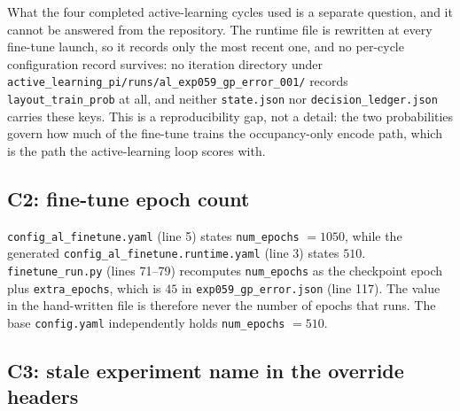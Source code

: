What the four completed active-learning cycles used is a separate question, and it cannot
be answered from the repository. The runtime file is rewritten at every fine-tune launch,
so it records only the most recent one, and no per-cycle configuration record survives: no
iteration directory under
\texttt{active\_learning\_pi/runs/al\_exp059\_gp\_error\_001/} records
\texttt{layout\_train\_prob} at all, and neither \texttt{state.json} nor
\texttt{decision\_ledger.json} carries these keys. This is a reproducibility gap, not a
detail: the two probabilities govern how much of the fine-tune trains the occupancy-only
encode path, which is the path the active-learning loop scores with.

\subsection*{C2: fine-tune epoch count}

\texttt{config\_al\_finetune.yaml} (line 5) states \texttt{num\_epochs} $=1050$, while the
generated \texttt{config\_al\_finetune.runtime.yaml} (line 3) states $510$.
\texttt{finetune\_run.py} (lines 71--79) recomputes \texttt{num\_epochs} as the checkpoint
epoch plus \texttt{extra\_epochs}, which is $45$ in \texttt{exp059\_gp\_error.json}
(line 117). The value in the hand-written file is therefore never the number of epochs
that runs. The base \texttt{config.yaml} independently holds \texttt{num\_epochs} $=510$.

\subsection*{C3: stale experiment name in the override headers}

